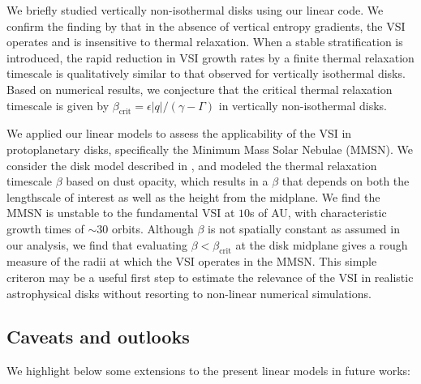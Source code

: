 
We briefly studied vertically non-isothermal disks using our linear 
code. We confirm the finding by \cite{nelson13} that in the absence
of vertical entropy gradients, the VSI operates and is insensitive to
thermal relaxation. When a stable stratification is introduced, the
rapid reduction in VSI growth rates by a finite thermal relaxation
timescale is qualitatively similar to that observed for vertically
isothermal disks. Based on numerical results, we conjecture that the
critical thermal relaxation timescale is given by 
$\beta_\mathrm{crit}=\epsilon|q|/(\gamma-\Gamma)$ in vertically 
non-isothermal disks.  


We applied our linear models to assess the applicability of the VSI in
protoplanetary disks, specifically the Minimum Mass Solar Nebulae
(MMSN). We consider the disk model described in \cite{chiang10}, and
modeled the thermal relaxation timescale $\beta$ based on
dust opacity, which results in a $\beta$ that depends on both the
lengthscale of interest as well as the height from the midplane.  
We find the MMSN is unstable to the fundamental VSI at $10$s of AU,
with characteristic growth times of $\sim 30$ orbits. Although $\beta$
is not spatially constant as assumed in our analysis, we find that
evaluating $\beta < \beta_\mathrm{crit}$ at the disk
midplane gives a rough measure of the radii at which the VSI operates in the
MMSN.  This simple criteron may be a useful first step to 
estimate the relevance of the VSI in realistic astrophysical
disks without resorting to non-linear numerical simulations. 



\subsection{Caveats and outlooks} 
We highlight below some extensions to the present  
linear models in future works:  

